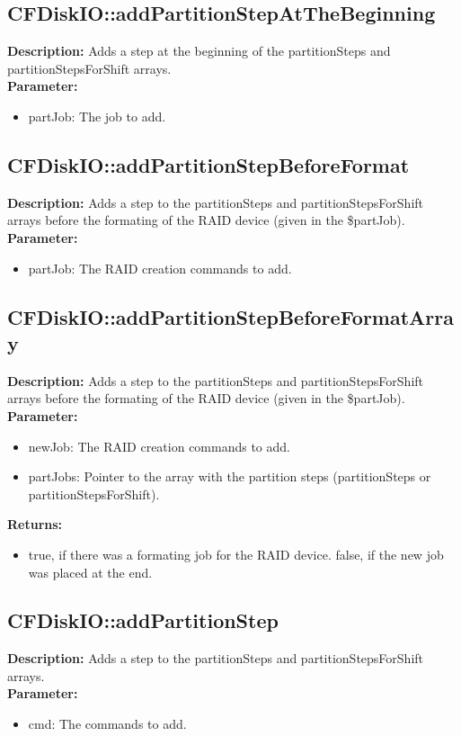 \subsection{CFDiskIO::addPartitionStepAtTheBeginning}
\textbf{Description:} Adds a step at the beginning of the partitionSteps and partitionStepsForShift arrays.\\
\textbf{Parameter:}
\begin{itemize}
\item partJob: The job to add.
\end{itemize}

\subsection{CFDiskIO::addPartitionStepBeforeFormat}
\textbf{Description:} Adds a step to the partitionSteps and partitionStepsForShift arrays before the formating of the RAID device (given in the \$partJob).\\
\textbf{Parameter:}
\begin{itemize}
\item partJob: The RAID creation commands to add.
\end{itemize}

\subsection{CFDiskIO::addPartitionStepBeforeFormatArray}
\textbf{Description:} Adds a step to the partitionSteps and partitionStepsForShift arrays before the formating of the RAID device (given in the \$partJob).\\
\textbf{Parameter:}
\begin{itemize}
\item newJob: The RAID creation commands to add.
\item partJobs: Pointer to the array with the partition steps (partitionSteps or partitionStepsForShift).
\end{itemize}
\textbf{Returns:}
\begin{itemize}
\item true, if there was a formating job for the RAID device. false, if the new job was placed at the end.
\end{itemize}

\subsection{CFDiskIO::addPartitionStep}
\textbf{Description:} Adds a step to the partitionSteps and partitionStepsForShift arrays.\\
\textbf{Parameter:}
\begin{itemize}
\item cmd: The commands to add.
\end{itemize}

